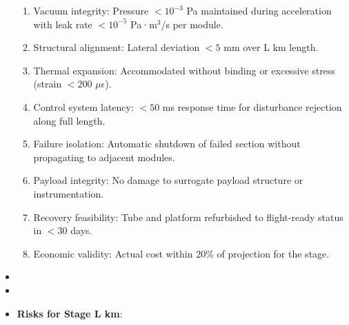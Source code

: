 \begin{itemize}
\begin{enumerate}
            \item Vacuum integrity: Pressure $< 10^{-3}$ Pa maintained during acceleration with leak rate $< 10^{-5}$ Pa·m$^3$/s per module.
            \item Structural alignment: Lateral deviation $< 5$ mm over L km length.
            \item Thermal expansion: Accommodated without binding or excessive stress (strain $< 200$ $\mu\epsilon$).
            \item Control system latency: $< 50$ ms response time for disturbance rejection along full length.
            \item Failure isolation: Automatic shutdown of failed section without propagating to adjacent modules.
            \item Payload integrity: No damage to surrogate payload structure or instrumentation.
            \item Recovery feasibility: Tube and platform refurbished to flight-ready status in $< 30$ days.
            \item Economic validity: Actual cost within 20\% of projection for the stage.
        \end{enumerate}
    \item \item \item \textbf{Risks for Stage L km}:
\end{itemize}
